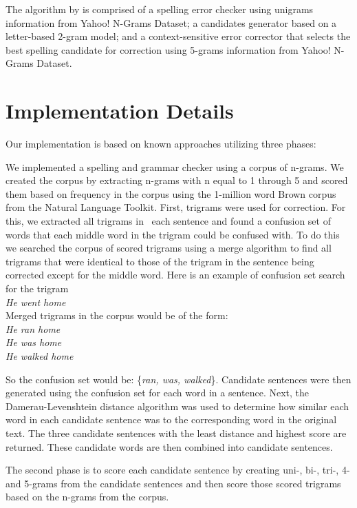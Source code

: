 \documentclass[twocolumn]{article}
\newcommand{\tab}{\hspace*{2em}}
\begin{document}
The algorithm by \cite{Bassil12} is comprised of a spelling error checker using
unigrams information from Yahoo! N-Grams Dataset; a candidates generator based
on a letter-based 2-gram model; and a context-sensitive error corrector that
selects the best spelling candidate for correction using 5-grams information
from Yahoo! N-Grams Dataset.

\section{Implementation Details}
Our implementation is based on known approaches utilizing three phases:

We implemented a spelling and grammar checker using a corpus of n-grams. We
created the corpus by extracting n-grams with n equal to 1 through 5 and scored
them based on frequency in the corpus using the 1-million word Brown corpus from
the Natural Language Toolkit.
First, trigrams were used for correction. For this, we extracted all trigrams in
 each sentence and found a confusion set of words that each middle word in the
trigram could be confused with. To do this we searched the corpus of scored
trigrams using a merge algorithm to find all trigrams that were identical to
those of the trigram in the sentence being corrected except for the middle word.
Here is an example of confusion set search for the trigram
\\
\newline
\tab\tab\emph{He went home}
\\\newline
Merged trigrams in the corpus would be of the form:
\\\newline
\tab\tab\emph{He ran home} \\
\tab\tab\emph{He was home} \\
\tab\tab\emph{He walked home}
\newline

So the confusion set would be: \{\emph{ran, was, walked}\}. Candidate sentences
were then generated using the confusion set for each word in a sentence. Next,
the Damerau-Levenshtein distance \cite{damerau64,levenshtein66} algorithm was
used to determine how similar each word in each candidate sentence was to the
corresponding word in the original text. The three candidate sentences with the
least distance and highest score are returned. These candidate words are then
combined into candidate sentences.

The second phase is to score each candidate sentence by creating uni-, bi-,
tri-, 4- and 5-grams from the candidate sentences and then score those scored
trigrams based on the n-grams from the corpus.
\end{document}
